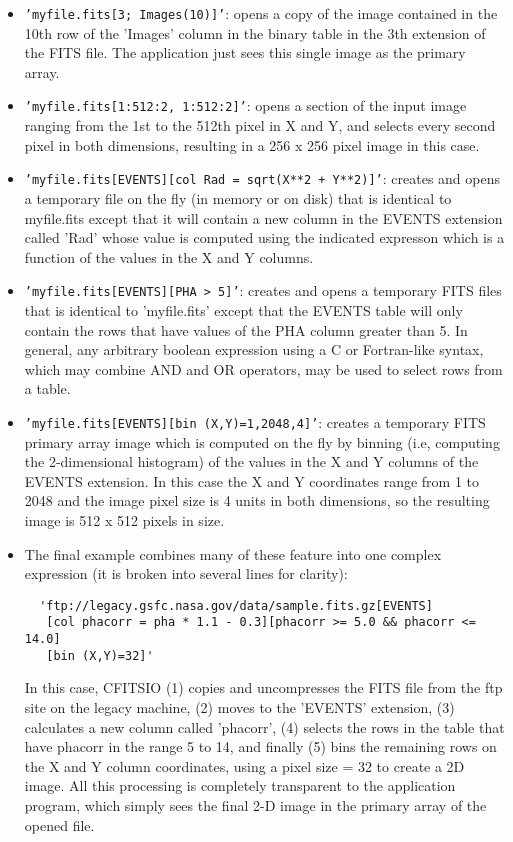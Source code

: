 \documentclass[11pt]{book}
\begin{document}
\begin{itemize}
\item
{\tt 'myfile.fits[3; Images(10)]'}: opens a copy of the image contained in the
10th row of the 'Images' column in the binary table in the 3th extension
of the FITS file.  The application just sees this single image as the
primary array.

\item
{\tt 'myfile.fits[1:512:2, 1:512:2]'}: opens a section of the input image
ranging from the 1st to the 512th pixel in  X and Y, and selects every
second pixel in both dimensions, resulting in a 256 x 256 pixel image
in this case.

\item
{\tt 'myfile.fits[EVENTS][col Rad = sqrt(X**2 + Y**2)]'}:  creates and opens
a temporary file on the fly (in memory or on disk) that is identical to
myfile.fits except that it will contain a new column in the EVENTS
extension called 'Rad' whose value is computed using the indicated
expresson which is a function of the values in the X and Y columns.

\item
{\tt 'myfile.fits[EVENTS][PHA > 5]'}:  creates and opens a temporary FITS
files that is identical to 'myfile.fits' except that the EVENTS table
will only contain the rows that have values of the PHA column greater
than 5.  In general, any arbitrary boolean expression using a C or
Fortran-like syntax, which may combine AND and OR operators,
may be used to select rows from a table.

\item
{\tt 'myfile.fits[EVENTS][bin (X,Y)=1,2048,4]'}:  creates a temporary FITS
primary array image which is computed on the fly by binning (i.e,
computing the 2-dimensional histogram) of the values in the X and Y
columns of the EVENTS extension.  In this case the X and Y coordinates
range from 1 to 2048 and the image pixel size is 4 units in both
dimensions, so the resulting image is 512 x 512 pixels in size.

\item
The final example combines many of these feature into one complex
expression (it is broken into several lines for clarity):

\begin{verbatim}
  'ftp://legacy.gsfc.nasa.gov/data/sample.fits.gz[EVENTS]
   [col phacorr = pha * 1.1 - 0.3][phacorr >= 5.0 && phacorr <= 14.0]
   [bin (X,Y)=32]'
\end{verbatim}
In this case, CFITSIO (1) copies and uncompresses the FITS file from
the ftp site on the legacy machine, (2) moves to the 'EVENTS'
extension, (3) calculates a new column called 'phacorr', (4) selects
the rows in the table that have phacorr in the range 5 to 14, and
finally (5) bins the remaining rows on the X and Y column coordinates,
using a pixel size = 32 to create a 2D image.  All this processing is
completely transparent to the application program, which simply sees
the final 2-D image in the primary array of the opened file.
\end{itemize}
\end{document}
